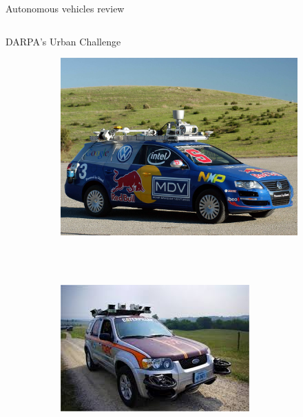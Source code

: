 \begin{frame}{Autonomous vehicles review}
\begin{columns}[T]
\begin{center}
\begin{overlayarea}{\textwidth}{\textheight}
{\begin{block}{DARPA's Urban Challenge}
\begin{figure}[t]
\begin{subfigure}[b]{0.4\textwidth}
		      \includegraphics[width=\textwidth]{junior}
		    \end{subfigure}
		    \\~\\
		    \begin{subfigure}[b]{0.4\textwidth}
		      \includegraphics[width=\textwidth]{odin}
		    \end{subfigure}
		    ~
		    \begin{subfigure}[b]{0.4\textwidth}

\end{subfigure}
\end{figure}
\end{block}}
\end{overlayarea}
\end{center}
\end{columns}
\end{frame}
